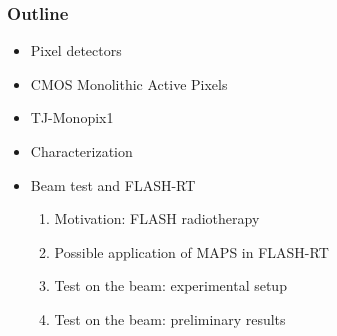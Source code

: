 \documentclass{beamer}
\begin{document}
\begin{frame}[noframenumbering]
    \frametitle{Outline}
    \begin{itemize}
        \item Pixel detectors 
        \item CMOS Monolithic Active Pixels 
        \item TJ-Monopix1
        \item Characterization 
        \item <alert@1> Beam test and FLASH-RT
        \begin{enumerate}
            \item Motivation: FLASH radiotherapy
            \item Possible application of MAPS in FLASH-RT 
            \item Test on the beam: experimental setup
            \item Test on the beam: preliminary results
        \end{enumerate}
    \end{itemize}
\end{frame}






        
\end{document}
